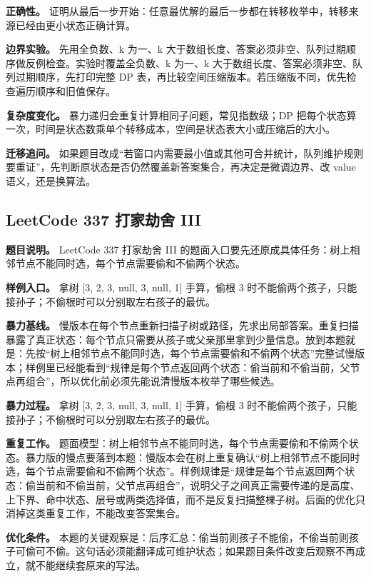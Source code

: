 \textbf{正确性。} 证明从最后一步开始：任意最优解的最后一步都在转移枚举中，转移来源已经由更小状态正确计算。

\textbf{边界实验。} 先用全负数、k 为一、k 大于数组长度、答案必须非空、队列过期顺序做反例检查。实验时覆盖全负数、k 为一、k 大于数组长度、答案必须非空、队列过期顺序，先打印完整 DP 表，再比较空间压缩版本。若压缩版不同，优先检查遍历顺序和旧值保存。

\textbf{复杂度变化。} 暴力递归会重复计算相同子问题，常见指数级；DP 把每个状态算一次，时间是状态数乘单个转移成本，空间是状态表大小或压缩后的大小。

\textbf{迁移追问。} 如果题目改成“若窗口内需要最小值或其他可合并统计，队列维护规则要重证”，先判断原状态是否仍然覆盖新答案集合，再决定是微调边界、改 value 语义，还是换算法。

\subsection{LeetCode 337 打家劫舍 III}

\textbf{题目说明。} LeetCode 337 打家劫舍 III 的题面入口要先还原成具体任务：树上相邻节点不能同时选，每个节点需要偷和不偷两个状态。

\textbf{样例入口。} 拿树 [3, 2, 3, null, 3, null, 1] 手算，偷根 3 时不能偷两个孩子，只能接孙子；不偷根时可以分别取左右孩子的最优。

\textbf{暴力基线。} 慢版本在每个节点重新扫描子树或路径，先求出局部答案。重复扫描暴露了真正状态：每个节点只需要从孩子或父亲那里拿到少量信息。放到本题就是：先按“树上相邻节点不能同时选，每个节点需要偷和不偷两个状态”完整试慢版本；样例里已经能看到“规律是每个节点返回两个状态：偷当前和不偷当前，父节点再组合”，所以优化前必须先能说清慢版本枚举了哪些候选。

\textbf{暴力过程。} 拿树 [3, 2, 3, null, 3, null, 1] 手算，偷根 3 时不能偷两个孩子，只能接孙子；不偷根时可以分别取左右孩子的最优。

\textbf{重复工作。} 题面模型：树上相邻节点不能同时选，每个节点需要偷和不偷两个状态。暴力版的慢点要落到本题：慢版本会在树上重复确认“树上相邻节点不能同时选，每个节点需要偷和不偷两个状态”。样例规律是“规律是每个节点返回两个状态：偷当前和不偷当前，父节点再组合”，说明父子之间真正需要传递的是高度、上下界、命中状态、层号或两类选择值，而不是反复扫描整棵子树。后面的优化只消掉这类重复工作，不能改变答案集合。

\textbf{优化条件。} 本题的关键观察是：后序汇总：偷当前则孩子不能偷，不偷当前则孩子可偷可不偷。这句话必须能翻译成可维护状态；如果题目条件改变后观察不再成立，就不能继续套原来的写法。

